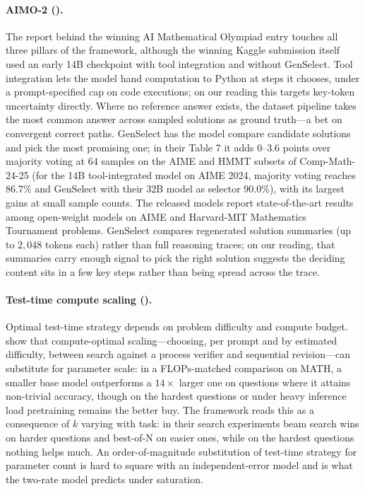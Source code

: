 \paragraph{AIMO-2 (\citet{moshkov2025aimo}).}
The report behind the winning AI Mathematical Olympiad entry touches all three pillars of the framework, although the winning Kaggle submission itself used an early 14B checkpoint with tool integration and without GenSelect. Tool integration lets the model hand computation to Python at steps it chooses, under a prompt-specified cap on code executions; on our reading this targets key-token uncertainty directly. Where no reference answer exists, the dataset pipeline takes the most common answer across sampled solutions as ground truth---a bet on convergent correct paths. GenSelect has the model compare candidate solutions and pick the most promising one; in their Table 7 it adds $0$--$3.6$ points over majority voting at $64$ samples on the AIME and HMMT subsets of Comp-Math-24-25 (for the 14B tool-integrated model on AIME 2024, majority voting reaches $86.7\%$ and GenSelect with their 32B model as selector $90.0\%$), with its largest gains at small sample counts. The released models report state-of-the-art results among open-weight models on AIME and Harvard-MIT Mathematics Tournament problems. GenSelect compares regenerated solution summaries (up to $2{,}048$ tokens each) rather than full reasoning traces; on our reading, that summaries carry enough signal to pick the right solution suggests the deciding content sits in a few key steps rather than being spread across the trace.

\paragraph{Test-time compute scaling (\citet{snell2024scaling}).}
Optimal test-time strategy depends on problem difficulty and compute budget. \citet{snell2024scaling} show that compute-optimal scaling---choosing, per prompt and by estimated difficulty, between search against a process verifier and sequential revision---can substitute for parameter scale: in a FLOPs-matched comparison on MATH, a smaller base model outperforms a $14\times$ larger one on questions where it attains non-trivial accuracy, though on the hardest questions or under heavy inference load pretraining remains the better buy. The framework reads this as a consequence of $k$ varying with task: in their search experiments beam search wins on harder questions and best-of-N on easier ones, while on the hardest questions nothing helps much. An order-of-magnitude substitution of test-time strategy for parameter count is hard to square with an independent-error model and is what the two-rate model predicts under saturation.

